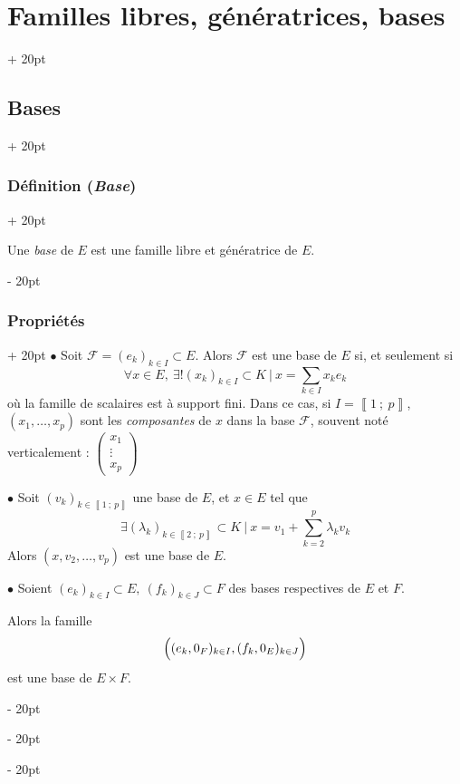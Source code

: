 \documentclass[a4paper, 12pt, twoside]{article}
\newcommand{\nset}[2]{\left\llbracket #1\ ;\ #2 \right\rrbracket}
\newcommand{\lr}[1]{\left( #1 \right)}
\newcommand{\ind}[1][20pt]{\advance\leftskip + #1}
\newcommand{\deind}[1][20pt]{\advance\leftskip - #1}
\newenvironment{indt}[2][20pt]{#2 \par \ind[#1]}{\par \deind} %
\begin{document}
\begin{indt}{\section{Familles libres, génératrices, bases}}
\begin{indt}{\subsection{Bases}}
\begin{indt}{\subsubsection{Définition (\textit{Base})}}
                \vspace{6pt}
                
                Une \textit{base} de $E$ est une famille libre et génératrice de $E$.
            \end{indt}
            
            \vspace{12pt}
            
            \begin{indt}{\subsubsection{Propriétés}}
                $\bullet$ Soit $\mathcal F = (e_k)_{k \in I} \subset E$.
                Alors $\mathcal F$ est une base de $E$ si, et seulement si
                    \[
                        \forall x \in E,\
                        \exists! (x_k)_{k \in I} \subset K\ |\
                        x = \sum_{k \in I} x_k e_k
                    \]
                où la famille de scalaires est à support fini.
                Dans ce cas, si $I = \nset 1 p$, $(x_1, \ldots, x_p)$ sont les \textit{composantes} de $x$ dans la base $\mathcal F$, souvent noté verticalement :
                $
                    \begin{pmatrix}
                        x_1
                        \\
                        \vdots
                        \\
                        x_p
                    \end{pmatrix}
                $
                
                \vspace{12pt}
                
                $\bullet$ Soit $(v_k)_{k \in \nset 1 p}$ une base de $E$, et $x \in E$ tel que
                    \[ \exists (\lambda_k)_{k \in \nset 2 p} \subset K\ |\ x = v_1 + \sum_{k = 2}^p \lambda_k v_k \]
                Alors $(x, v_2, \ldots, v_p)$ est une base de $E$.
                
                \vspace{12pt}
                
                $\bullet$ Soient $(e_k)_{k \in I} \subset E,\ (f_k)_{k \in J} \subset F$ des bases respectives de $E$ et $F$.
                
                Alors la famille
                    \[ \lr{ \vphantom{\frac a a} (e_k, 0_F)_{k \in I}, (f_k, 0_E)_{k \in J}} \]
                est une base de $E \times F$.
            \end{indt}
        \end{indt}
        
    \end{indt}
    
\end{document}
